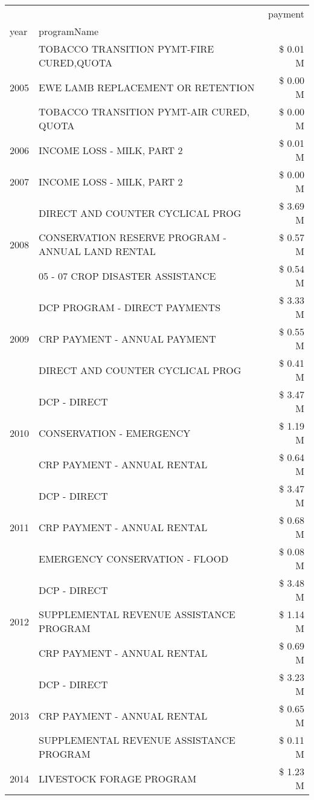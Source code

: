 \begin{tabular}{llr}
\toprule
 &  & payment \\
year & programName &  \\
\midrule
\multirow[t]{3}{*}{2005} & TOBACCO TRANSITION PYMT-FIRE CURED,QUOTA & \$ 0.01 M \\
 & EWE LAMB REPLACEMENT OR RETENTION & \$ 0.00 M \\
 & TOBACCO TRANSITION PYMT-AIR CURED, QUOTA & \$ 0.00 M \\
\cline{1-3}
2006 & INCOME LOSS - MILK, PART 2 & \$ 0.01 M \\
\cline{1-3}
2007 & INCOME LOSS - MILK, PART 2 & \$ 0.00 M \\
\cline{1-3}
\multirow[t]{3}{*}{2008} & DIRECT AND COUNTER CYCLICAL PROG & \$ 3.69 M \\
 & CONSERVATION RESERVE PROGRAM - ANNUAL LAND RENTAL & \$ 0.57 M \\
 & 05 - 07 CROP DISASTER ASSISTANCE & \$ 0.54 M \\
\cline{1-3}
\multirow[t]{3}{*}{2009} & DCP PROGRAM - DIRECT PAYMENTS & \$ 3.33 M \\
 & CRP PAYMENT - ANNUAL PAYMENT & \$ 0.55 M \\
 & DIRECT AND COUNTER CYCLICAL PROG & \$ 0.41 M \\
\cline{1-3}
\multirow[t]{3}{*}{2010} & DCP - DIRECT & \$ 3.47 M \\
 & CONSERVATION - EMERGENCY & \$ 1.19 M \\
 & CRP PAYMENT - ANNUAL RENTAL & \$ 0.64 M \\
\cline{1-3}
\multirow[t]{3}{*}{2011} & DCP - DIRECT & \$ 3.47 M \\
 & CRP PAYMENT - ANNUAL RENTAL & \$ 0.68 M \\
 & EMERGENCY CONSERVATION - FLOOD & \$ 0.08 M \\
\cline{1-3}
\multirow[t]{3}{*}{2012} & DCP - DIRECT & \$ 3.48 M \\
 & SUPPLEMENTAL REVENUE ASSISTANCE PROGRAM & \$ 1.14 M \\
 & CRP PAYMENT - ANNUAL RENTAL & \$ 0.69 M \\
\cline{1-3}
\multirow[t]{3}{*}{2013} & DCP - DIRECT & \$ 3.23 M \\
 & CRP PAYMENT - ANNUAL RENTAL & \$ 0.65 M \\
 & SUPPLEMENTAL REVENUE ASSISTANCE PROGRAM & \$ 0.11 M \\
\cline{1-3}
\multirow[t]{3}{*}{2014} & LIVESTOCK FORAGE PROGRAM & \$ 1.23 M \\

\end{tabular}
